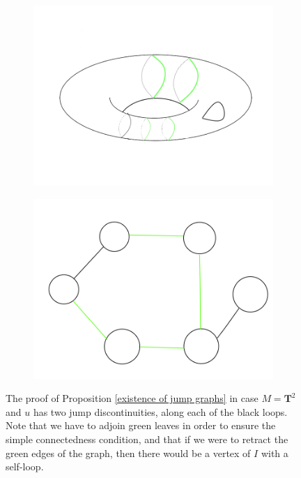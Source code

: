 \documentclass[reqno,11pt]{amsart}
\theoremstyle{definition}
\numberwithin{equation}{section}
\begin{document}
\begin{figure}
\centering
\begin{subfigure}[b]{0.4\linewidth}
\includegraphics[width=\linewidth]{sample torus.png}
\end{subfigure}
\begin{subfigure}[b]{0.4\linewidth}
\includegraphics[width=\linewidth]{torus graph.png}
\end{subfigure}
\caption{The proof of Proposition \ref{existence of jump graphs} in case $M = \mathbf T^2$ and $u$ has two jump discontinuities, along each of the black loops. Note that we have to adjoin green leaves in order to ensure the simple connectedness condition, and that if we were to retract the green edges of the graph, then there would be a vertex of $I$ with a self-loop.}
\label{torus graphs}
\end{figure}
\end{document}
